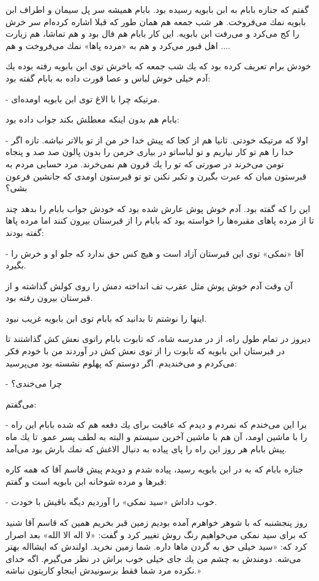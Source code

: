 \documentclass[12pt,a4paper]{book}
\begin{document}
گفتم که جنازه بابام به ابن بابویه رسیده بود. بابام همیشه سر پل سیمان و اطراف ابن بابویه نمك می‌فروخت. هر شب جمعه هم همان طور که قبلا اشاره کرده‌ام سر خرش را کج می‌کرد و می‌رفت ابن بابویه. این کار بابام هم فال بود و هم تماشا، هم زیارت اهل قبور می‌کرد و هم به «مرده پاها» نمك می‌فروخت و هم ....

خودش برام تعریف کرده بود که يك شب جمعه که باخرش توی ابن بابویه رفته بوده يك آدم خیلی خوش لباس و عصا قورت داده به بابام گفته بود:

- مرتیکه چرا با الاغ توی ابن بابویه اومده‌ای.

بابام هم بدون اینکه معطلش بکند جواب داده بود:

- اولا که مرتیکه خودتی. ثانيا هم از کجا که پیش خدا خر من از تو بالاتر نباشه. تازه اگر خدا را هم تو کار نیاریم و تو لباساتو در بیاری خرمن را بدون پالون صد صد و پنجاه تومن می‌خرند در صورتی که تو را یك قرون هم نمی‌خرند. مرد حسابی مردم به قبرستون میان که عبرت بگیرن و تکبر نکنن تو تو قبرستون اومدی که جانشین فرعون بشی؟

این را که گفته بود. آدم خوش پوش عارش شده بود که خودش جواب بابام را بدهد چند تا از مرده پاهای مقبره‌ها را خواسته بود که بابام را از قبرستان بیرون کنند اما مرده پاها گفته بودند:

- آقا «نمکی» توی این قبرستان آزاد است و هیچ کس حق ندارد که جلو او و خرش را بگیرد.

آن وقت آدم خوش پوش مثل عقرب تف انداخته دمش را روی کولش گذاشته و از قبرستان بیرون رفته بود.

اینها را نوشتم تا بدانید که بابام توی ابن بابویه غريب نبود.

دیروز در تمام طول راه، از در مدرسه شاه، که تابوت بابام راتوی نعش کش گذاشتند تا در قبرستان ابن بابویه که تابوت را از توی نعش کش در آوردند من با خودم فکر می‌کردم و می‌خندیدم. اگر دوستم که پهلوم نشسته بود می‌پرسید:

- چرا می‌خندی؟

می‌گفتم:

- برا این می‌خندم که نمردم و دیدم که عاقبت برای يك دفعه هم که شده بابام این راه را با ماشین اومد، آن هم با ماشین آخرین سیستم و البته به لطف پسر عمو. تا يك ماه پیش بابام هر روز این راه را پای پیاده به دنبال الاغش که نمك بارش بود می‌آمد.

جنازه بابام که به در ابن بابویه رسید، پیاده شدم و دویدم پیش قاسم آقا که همه کاره قبرها و مرده شوخانه ابن بابویه است و گفتم:

- خوب داداش «سید نمکی» را آوردیم دیگه باقیش با خودت.

روز پنجشنبه که با شوهر خواهرم آمده بودیم زمین قبر بخریم همین که قاسم آقا شنید که برای سید نمکی می‌خواهیم رنگ روش تغییر کرد و گفت: «لا اله الا الله» بعد اصرار کرد که: «سید خیلی حق به گردن ماها داره. شما زمین نخرید. اولندش که ایشااله بهتر می‌شه. دومندش به چشم من يك جای خیلی خوب براش در نظر می‌گیرم. اگه خدای نکرده مرد شما فقط برسونیدش اینجاو کاریتون نباشه.»
\end{document}
